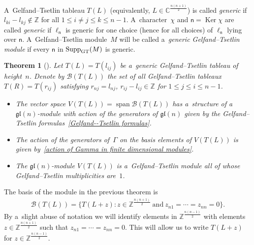 \documentclass[pdftex]{sigma}
\DeclareMathOperator\Span{span} \DeclareMathOperator\Ker{Ker}
\DeclareMathOperator\Supp{Supp} \DeclareMathOperator\codim{codim} \DeclareMathOperator\Y{Y}
\numberwithin{equation}{section}
\newtheorem{Theorem}{Theorem}[section]
\begin{document}
\begin{Definition}
\label{def-gen}
A~Gelfand--Tsetlin tableau $T(L)$ \big(equivalently, $L\in{\mathbb C}^{\frac{n(n+1)}{2}}$\big) is called \emph{generic} if
$l_{ki}-l_{kj}\notin\mathbb{Z}$ for all $1\leq i\neq j \leq k \leq n-1$.
A~character~$\chi$ and $\mathsf n = \Ker \chi$ are called \emph{generic} if $\ell_{\mathsf n}$ is generic for one choice
(hence for all choices) of $\ell_{\mathsf n}$ lying over $\mathsf n$.
A~Gelfand--Tsetlin module~$M$ will be called a~\emph{generic Gelfand--Tsetlin module} if every $\mathsf n$ in
$\Supp_{\rm GT}(M)$ is generic.
\end{Definition}

\begin{Theorem}[]%
Let $T(L) = T(l_{ij})$ be a~generic Gelfand--Tsetlin tableau of height~$n$.
Denote by ${\mathcal B}(T(L))$ the set of all Gelfand--Tsetlin tableaux $T(R) = T(r_{ij})$ satisfying $r_{nj}=l_{nj}$,
$r_{ij}-l_{ij}\in\mathbb{Z}$ for
$1\leq j\leq i \leq n-1$.
\begin{itemize}\itemsep=0pt
\item[$(i)$] The vector space $V(T(L)) = \Span {\mathcal B}(T(L))$ has a~structure of a~$\mathfrak{gl}(n)$-module with
action of the generators of $\mathfrak{gl}(n)$ given by the Gelfand--Tsetlin formulas~\eqref{Gelfand--Tsetlin formulas}.
\item[$(ii)$] The action of the generators of~$\Gamma$ on the basis elements of $V(T(L))$ is given by~\eqref{action of Gamma in finite dimensional modules}.
\item[$(iii)$] The $\mathfrak{gl}(n)$-module $V(T(L))$ is a~Gelfand--Tsetlin module all of whose Gelfand--Tsetlin
multiplicities are~$1$.
\end{itemize}
\end{Theorem}

\begin{Remark}

The basis of the module in the previous theorem is
\begin{gather*}
{\mathcal B}(T(L)) = \big\{T(L+z):z\in\mathbb{Z}^{\frac{n(n+1)}{2}}~\text{and}~z_{n1}=\cdots=z_{nn}=0\big\}.
\end{gather*}
By a~slight abuse of notation we will identify elements in $\mathbb{Z}^{\frac{n(n-1)}{2}}$ with elements
$z\in\mathbb{Z}^{\frac{n(n+1)}{2}}$ such that $z_{n1}=\cdots=z_{nn}=0$.
This will allow us to write $T(L+z)$ for $z\in\mathbb{Z}^{\frac{n(n-1)}{2}}$.
\end{Remark}
\end{document}
